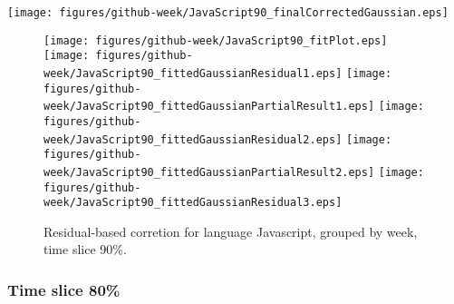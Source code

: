 \begin{center}
{\texttt{[image: figures/github-week/JavaScript90\_finalCorrectedGaussian.eps]}}
\end{center}

\FloatBarrier

\begin{figure}[t]
\centering
{}
{\texttt{[image: figures/github-week/JavaScript90\_fitPlot.eps]}}
{\texttt{[image: figures/github-week/JavaScript90\_fittedGaussianResidual1.eps]}}
{\texttt{[image: figures/github-week/JavaScript90\_fittedGaussianPartialResult1.eps]}}
{\texttt{[image: figures/github-week/JavaScript90\_fittedGaussianResidual2.eps]}}
{\texttt{[image: figures/github-week/JavaScript90\_fittedGaussianPartialResult2.eps]}}
{\texttt{[image: figures/github-week/JavaScript90\_fittedGaussianResidual3.eps]}}
\caption{Residual-based corretion for language Javascript, grouped by week, time slice 90\%.}
\end{figure}


\FloatBarrier


\subsubsection{Time slice 80\%}


